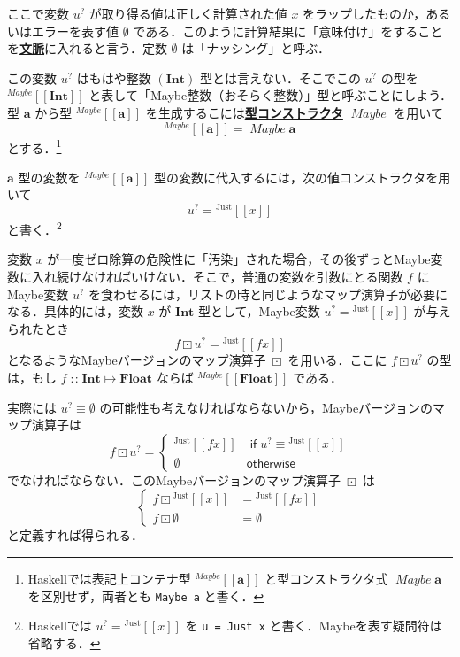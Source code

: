 \documentclass[a4paper,twocolumn]{jsbook}
\def\[{\left[\!\left[}
\def\]{\right]\!\right]}
\newcommand{\programminglanguage}[1]{\textsf{#1}}
\newcommand{\haskell}{\programminglanguage{Haskell}}
\newcommand{\keyword}[1]{{\underline{\textbf{#1}}}}
\newcommand{\code}[1]{\texttt{#1}}
\newcommand{\mKeyword}[1]{\mathsf{#1}} %
\newcommand{\mIfKeyword}{\mKeyword{if}}
\newcommand{\mOtherwiseKeyword}{\mKeyword{otherwise}}
\DeclareMathOperator{\mIf}{\mIfKeyword}
\DeclareMathOperator{\mOtherwise}{\mOtherwiseKeyword}
\newcommand{\mNothing}{\emptyset}
\DeclareMathOperator{\mIn}{{:\!:}}
\DeclareMathOperator{\mMapMaybe}{\boxdot}
\DeclareMathOperator{\mMapsTo}{\mapsto}
\newcommand{\mType}[1]{\mathbf{#1}}
\newcommand{\mFloatType}{\mType{Float}}
\newcommand{\mIntType}{\mType{Int}}
\newcommand{\mTypeConstructor}[1]{\textit{#1}}
\DeclareMathOperator{\mMaybeTypeConstructor}{\mTypeConstructor{Maybe}}
\newcommand{\mGenericTypeAssemble}[2]{{}^{\mTypeConstructor{#1}}\[\mType{#2}\]}
\newcommand{\mMaybeType}[1]{\mGenericTypeAssemble{Maybe}{#1}}
\newcommand{\mGenericValueConstructor}[1]{\mathrm{#1}}
\newcommand{\mGenericWith}[2]{{}^\mGenericValueConstructor{#1}\[#2\]}
\newcommand{\mJustWith}[1]{\mGenericWith{Just}{#1}}
\newcommand{\mMaybe}[1]{{#1}^?}
\newcommand{\mProj}[2]{#1\mMapsTo#2}
\begin{document}
ここで変数 $\mMaybe{u}$ が取り得る値は正しく計算された値 $x$ をラップしたものか，あるいはエラーを表す値 $\mNothing$ である．このように計算結果に「意味付け」をすることを\keyword{文脈}に入れると言う．定数 $\mNothing$ は「ナッシング」と呼ぶ．

この変数 $\mMaybe{u}$ はもはや整数 $(\mIntType)$ 型とは言えない．そこでこの $\mMaybe{u}$ の型を $\mMaybeType{\mIntType}$ と表して「Maybe整数（おそらく整数）」型と呼ぶことにしよう．型 $\mType{a}$ から型 $\mMaybeType{a}$ を生成するこには\keyword{型コンストラクタ} $\mMaybeTypeConstructor$ を用いて
\begin{equation}
\mMaybeType{a}=\mMaybeTypeConstructor\mType{a}
\end{equation}
とする．\footnote{\haskell では表記上コンテナ型 $\mMaybeType{a}$ と型コンストラクタ式 $\mMaybeTypeConstructor\mType{a}$ を区別せず，両者とも \code{Maybe a} と書く．}

$\mType{a}$ 型の変数を $\mMaybeType{a}$ 型の変数に代入するには，次の値コンストラクタを用いて
\begin{equation}
\mMaybe{u}=\mJustWith{x}
\end{equation}
と書く．\footnote{\haskell では $\mMaybe{u}=\mJustWith{x}$ を \code{u = Just x} と書く．Maybeを表す疑問符は省略する．}

変数 $x$ が一度ゼロ除算の危険性に「汚染」された場合，その後ずっとMaybe変数に入れ続けなければいけない．そこで，普通の変数を引数にとる関数 $f$ にMaybe変数 $\mMaybe{u}$ を食わせるには，リストの時と同じようなマップ演算子が必要になる．具体的には，変数 $x$ が $\mType{Int}$ 型として，Maybe変数 $\mMaybe{u}=\mJustWith{x}$ が与えられたとき
\begin{equation}
f\mMapMaybe\mMaybe{u}=\mJustWith{fx}
\end{equation}
となるようなMaybeバージョンのマップ演算子 $\mMapMaybe$ を用いる．ここに $f\mMapMaybe\mMaybe{u}$ の型は，もし $f\mIn\mProj{\mIntType}{\mFloatType}$ ならば $\mMaybeType{\mFloatType}$ である．

実際には $\mMaybe{u}\equiv\mNothing$ の可能性も考えなければならないから，Maybeバージョンのマップ演算子は
\begin{equation}
f\mMapMaybe\mMaybe{u}=\begin{cases}
\mJustWith{fx}&\mIf\mMaybe{u}\equiv\mJustWith{x}\\
\mNothing&\mOtherwise
\end{cases}
\end{equation}
でなければならない．このMaybeバージョンのマップ演算子 $\mMapMaybe$ は
\begin{equation}
\left\{
\begin{aligned}
f\mMapMaybe\mJustWith{x}&=\mJustWith{fx}\\
f\mMapMaybe\mNothing&=\mNothing
\end{aligned}
\right.
\end{equation}
と定義すれば得られる．
\end{document}
